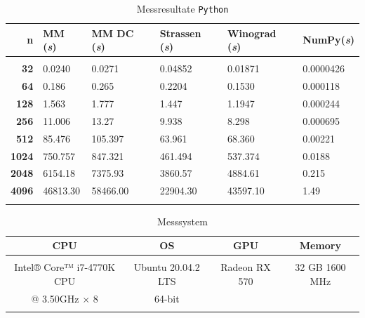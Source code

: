 	 \begin{table}
	 			 \begin{center}
	 					 \begin{tabular}{r l l l l l}
	 							 \hline
	 							 \hline
	 							 \textbf{n} & \textbf{MM (\textit{s})} &  \textbf{MM DC (\textit{s})} & \textbf{Strassen (\textit{s})}  & \textbf{Winograd (\textit{s})} & \textbf{NumPy(\textit{s})} \\
	 							 \hline
	 							 \multicolumn{6}{c}{} \\
	 							 \textbf{32}   & \phantom{000}0.0240     & \phantom{0000}0.0271& \phantom{0000}0.04852 & \phantom{0000}0.01871 & 0.0000426  \\
	 							 \textbf{64}   &\phantom{000} 0.186      & \phantom{0000}0.265 & \phantom{0000}0.2204  & \phantom{0000}0.1530& 0.000118 \\
	 							 \textbf{128}  &\phantom{000} 1.563      & \phantom{0000}1.777 & \phantom{0000}1.447   & \phantom{0000}1.1947 & 0.000244 \\
	 							 \textbf{256}  &\phantom{00} 11.006      & \phantom{000}13.27  & \phantom{0000}9.938   & \phantom{0000}8.298& 0.000695 \\
	 							 \textbf{512}  &\phantom{00} 85.476      & \phantom{00}105.397 & \phantom{000}63.961   & \phantom{000}68.360 &  0.00221\\
	 							 \textbf{1024} &\phantom{0} 750.757      & \phantom{00}847.321 & \phantom{00}461.494   & \phantom{00}537.374 & 0.0188 \\
								 \textbf{2048} & 6154.18                 & \phantom{0}7375.93  & \phantom{0}3860.57    & \phantom{0}4884.61 & 0.215 \\
								 \textbf{4096} & 46813.30                 & 58466.00               & 22904.30               & 43597.10 & 1.49 \\
	 							 \multicolumn{6}{c}{} \\
	 							 \hline
	 							 \hline
	 					 \end{tabular}
	 			 \end{center}
	 			 \caption{Messresultate \texttt{Python}}
	 			 \label{multiplikation:tab:messung_Python}
	 	 \end{table}

		 \begin{table}
		 			 \begin{center}
		 					 \begin{tabular}{c c c c}
		 							 \hline
		 							 \hline
		 							 \textbf{CPU} & \textbf{OS} &  \textbf{GPU } & \textbf{Memory }  \\
		 							 \hline
		 							 \multicolumn{4}{c}{} \\
		 							   Intel® Core™ i7-4770K CPU  & Ubuntu 20.04.2 LTS & Radeon RX 570 &  32 GB 1600 MHz   \\
										 @ 3.50GHz × 8  & 64-bit & &    \\
		 							 \multicolumn{4}{c}{} \\
		 							 \hline
		 							 \hline
		 					 \end{tabular}
		 			 \end{center}
		 			 \caption{Messsystem}
		 			 \label{multiplikation:tab:pc_config}
		 	 \end{table}

